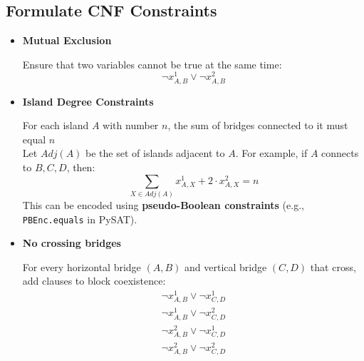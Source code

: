 \subsection{Formulate CNF Constraints}
\begin{itemize}
	\item \textbf{Mutual Exclusion}
	      \begin{flushleft}
		      Ensure that two variables cannot be true at the same time:
		      \begin{equation*}
			      \lnot x^1_{A,B} \lor \lnot x^2_{A,B}
		      \end{equation*}
	      \end{flushleft}
	\item \textbf{Island Degree Constraints}
	      \begin{flushleft}
		      For each island \(A\) with number \(n\), the sum of bridges connected to it must equal \(n\) \\
		      Let \(Adj(A)\) be the set of islands adjacent to \(A\). For example, if \(A\) connects to \(B, C, D\), then:
		      \begin{equation*}
			      \sum_{X \in Adj(A)} x^1_{A,X} + 2 \cdot x^2_{A,X} = n
		      \end{equation*}
		      This can be encoded using \textbf{pseudo-Boolean constraints} (e.g., \verb|PBEnc.equals| in PySAT).
	      \end{flushleft}
	\item \textbf{No crossing bridges}
	      \begin{flushleft}
		      For every horizontal bridge \((A,B)\) and vertical bridge \((C,D)\) that cross, add clauses to block coexistence:
		      \begin{gather*}
			      \lnot x^1_{A,B} \lor \lnot x^1_{C,D} \\
			      \lnot x^1_{A,B} \lor \lnot x^2_{C,D} \\
			      \lnot x^2_{A,B} \lor \lnot x^1_{C,D} \\
			      \lnot x^2_{A,B} \lor \lnot x^2_{C,D}
		      \end{gather*}
	      \end{flushleft}
\end{itemize}
